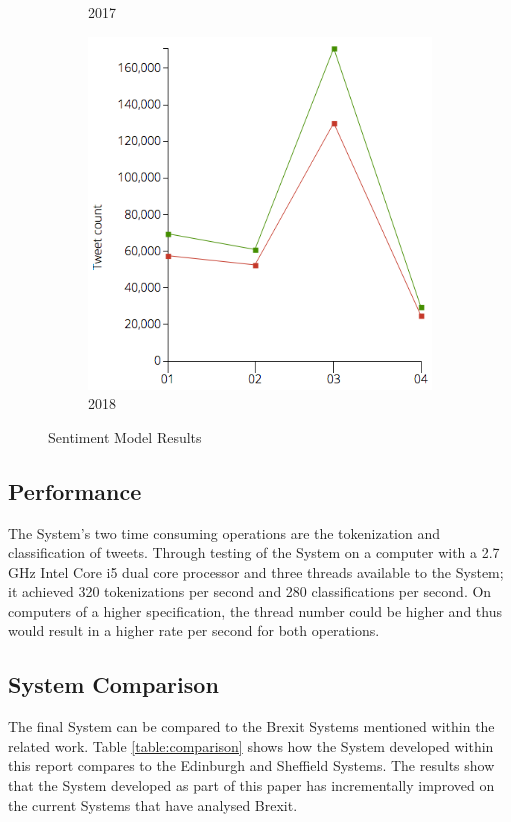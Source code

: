 \documentclass[11pt]{report}
\begin{document}
\begin{figure}[H]
\begin{subfigure}[b]{0.33\textwidth}
                \caption{2017}
                \label{fig:gull2}
        \end{subfigure}%
        \begin{subfigure}[b]{0.30\textwidth}
                \includegraphics[width=\linewidth]{images/2018-sentiment.png}
                \caption{2018}
                \label{fig:tiger}
        \end{subfigure}%

        \caption{Sentiment Model Results}\label{fig:sentiment-results}
\end{figure}

\subsection*{Performance}
The System's two time consuming operations are the tokenization and classification of tweets. Through testing of the System on a computer with a 2.7 GHz Intel Core i5 dual core processor and three threads available to the System; it achieved 320 tokenizations per second and 280 classifications per second. On computers of a higher specification, the thread number could be higher and thus would result in a higher rate per second for both operations.


\subsection*{System Comparison}
The final System can be compared to the Brexit Systems mentioned within the related work. Table \ref{table:comparison} shows how the System developed within this report compares to the Edinburgh \citep{llewellyn_brexit?_2016} and Sheffield \citep{maynard_framework_2017} Systems. The results show that the System developed as part of this paper has incrementally improved on the current Systems that have analysed Brexit.
\end{document}
